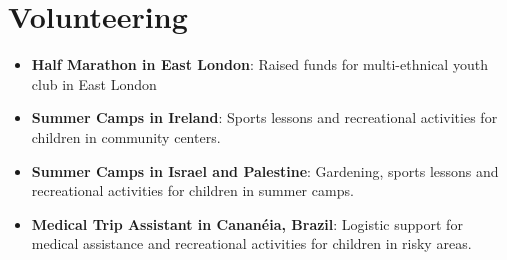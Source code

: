 \documentclass[margin]{res}
\begin{document}

\section{Volunteering}

\begin{itemize}

\item
  \textbf{Half Marathon in East London}: Raised funds for multi-ethnical
  youth club in East London
\item
  \textbf{Summer Camps in Ireland}: Sports lessons and recreational
  activities for children in community centers.
\item
  \textbf{Summer Camps in Israel and Palestine}: Gardening, sports
  lessons and recreational activities for children in summer camps.
\item
  \textbf{Medical Trip Assistant in Cananéia, Brazil}: Logistic support
  for medical assistance and recreational activities for children in
  risky areas.
\end{itemize}
\end{document}
